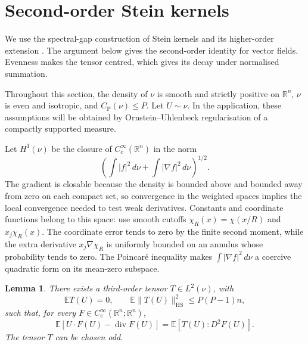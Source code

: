 \documentclass[11pt]{amsart}
\numberwithin{equation}{section}
\newtheorem{lemma}[theorem]{Lemma}
\theoremstyle{definition}
\theoremstyle{remark}
\newcommand{\R}{\mathbb R}
\newcommand{\E}{\mathbb E}
\newcommand{\CP}{C_{\mathrm P}}
\newcommand{\HS}{\mathrm{HS}}
\newcommand{\norm}[1]{\lVert #1\rVert}
\DeclareMathOperator{\Div}{div}
\begin{document}
\section{Second-order Stein kernels}
\label{sec:stein}

We use the spectral-gap construction of Stein kernels
\cite{CFP19} and its higher-order extension
\cite[Theorem~2.4]{Fathi21}. The argument below gives the second-order
identity for vector fields. Evenness makes the tensor centred, which
gives its decay under normalised summation.

Throughout this section, the density of \(\nu\) is smooth and strictly
positive on \(\R^n\), \(\nu\) is even and isotropic, and
\(\CP(\nu)\le P\). Let \(U\sim\nu\).
In the application, these assumptions will be obtained
by Ornstein--Uhlenbeck regularisation of a compactly supported measure.

Let \(H^1(\nu)\) be the closure of \(C_c^\infty(\R^n)\) in the norm
\[
\left(\int |f|^2\,d\nu+\int|\nabla f|^2\,d\nu\right)^{1/2}.
\]
The gradient is closable because the density is bounded above and
bounded away from zero on each compact set, so convergence in the
weighted spaces implies the local convergence needed to test weak
derivatives. Constants and coordinate functions belong to this space:
use smooth cutoffs \(\chi_R(x)=\chi(x/R)\) and \(x_j\chi_R(x)\).
The coordinate error tends to zero by the finite second moment, while
the extra derivative \(x_j\nabla\chi_R\) is uniformly bounded on an
annulus whose probability tends to zero. The Poincar\'e inequality makes
\(\int|\nabla f|^2\,d\nu\) a coercive quadratic form on its mean-zero
subspace.

\begin{lemma}\label{lem:second-stein}
There exists a third-order tensor \(T\in L^2(\nu)\), with
\[
\E T(U)=0,\qquad
\E\norm{T(U)}_{\HS}^2\le P(P-1)n,
\]
such that, for every \(F\in C_c^\infty(\R^n;\R^n)\),
\begin{equation}\label{eq:second-stein-identity}
\E[U\cdot F(U)-\Div F(U)]
=\E[T(U):D^2F(U)].
\end{equation}
The tensor \(T\) can be chosen odd.
\end{lemma}
\end{document}
